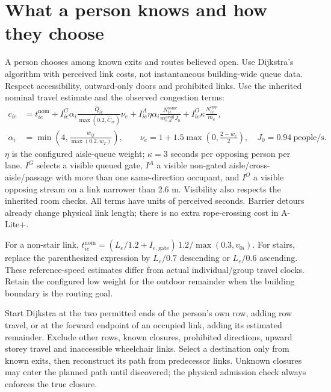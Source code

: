 \documentclass[11pt,a4paper]{article}
\begin{document}
\section{What a person knows and how they choose}

A person chooses among known exits and routes believed open. Use Dijkstra's algorithm with perceived link costs, not instantaneous building-wide queue data. Respect accessibility, outward-only doors and prohibited links. Use the inherited nominal travel estimate and the observed congestion terms:
\begin{align}
 c_{ie}&=t^{\mathrm{nom}}_{ie}
 +I^{G}_{ie}\alpha_i\frac{\widehat Q_{ie}}{\max(0.2,\widehat C_{ie})}\nu_e
 +I^{A}_{ie}\eta\alpha_i\frac{N^{\mathrm{same}}_{ie}}{m^{\mathrm{avail}}_{e,d}J_0}
 +I^{O}_{ie}\kappa\frac{N^{\mathrm{opp}}_{ie}}{m_e},\label{impl:route}\\
 \alpha_i&=\min\!\left(4,\frac{w_Q}{\max(0.2,w_T)}\right),\qquad
 \nu_e=1+1.5\max\!\left(0,\frac{2-w_e}{2}\right),\quad J_0=0.94\ \mathrm{people/s}.
\end{align}
$\eta$ is the configured aisle-queue weight; $\kappa=3$ seconds per opposing person per lane. $I^G$ selects a visible queued gate, $I^A$ a visible non-gated aisle/cross-aisle/passage with more than one same-direction occupant, and $I^O$ a visible opposing stream on a link narrower than 2.6 m. Visibility also respects the inherited room checks. All terms have units of perceived seconds. Barrier detours already change physical link length; there is no extra rope-crossing cost in A-Lite+.

For a non-stair link, $t^{\mathrm{nom}}_{ie}=(L_e/1.2+I_{e,\mathrm{gate}})\,1.2/\max(0.3,v_{0i})$. For stairs, replace the parenthesized expression by $L_e/0.7$ descending or $L_e/0.6$ ascending. These reference-speed estimates differ from actual individual/group travel clocks. Retain the configured low weight for the outdoor remainder when the building boundary is the routing goal.

Start Dijkstra at the two permitted ends of the person's own row, adding row travel, or at the forward endpoint of an occupied link, adding its estimated remainder. Exclude other rows, known closures, prohibited directions, upward storey travel and inaccessible wheelchair links. Select a destination only from known exits, then reconstruct its path from predecessor links. Unknown closures may enter the planned path until discovered; the physical admission check always enforces the true closure.
\end{document}
